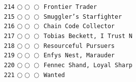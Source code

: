 \documentclass[a4paper,landscape]{article}
\begin{document}
\begin{multicols*}{5}
\texttt{214} \(\bigcirc\!\bigcirc\!\bigcirc\)  \texttt{Frontier Trader} \vspace{-0.3mm}\\ 
\texttt{215} \(\bigcirc\!\bigcirc\!\bigcirc\)  \texttt{Smuggler’s Starfighter} \vspace{-0.3mm}\\ 
\texttt{216} \(\bigcirc\!\bigcirc\!\bigcirc\)  \texttt{Chain Code Collector} \vspace{-0.3mm}\\ 
\texttt{217} \(\bigcirc\!\bigcirc\!\bigcirc\)  \texttt{Tobias Beckett, I Trust N} \vspace{-0.3mm}\\ 
\texttt{218} \(\bigcirc\!\bigcirc\!\bigcirc\)  \texttt{Resourceful Pursuers} \vspace{-0.3mm}\\ 
\texttt{219} \(\bigcirc\!\bigcirc\!\bigcirc\)  \texttt{Enfys Nest, Marauder} \vspace{-0.3mm}\\ 
\texttt{220} \(\bigcirc\!\bigcirc\!\bigcirc\)  \texttt{Fennec Shand, Loyal Sharp} \vspace{-0.3mm}\\ 
\texttt{221} \(\bigcirc\!\bigcirc\!\bigcirc\)  \texttt{Wanted} \vspace{-0.3mm}\\ 

\end{multicols*}
\end{document}
